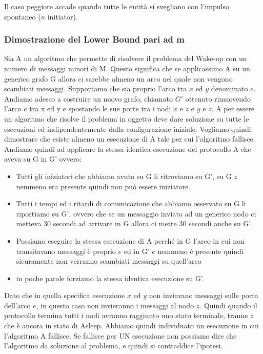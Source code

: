 Il caso peggiore accade quando tutte le entità si svegliano con l'impulso
spontaneo ($n$ initiator).

\subsubsection{Dimostrazione del Lower Bound pari ad m}
Sia A un algoritmo che permette di risolvere il problema del Wake-up con un
numero di messaggi minori di M. Questo significa che se applicassimo A su un
generico grafo G allora ci sarebbe almeno un arco nel quale non vengono
scambiati messaggi. Supponiamo che sia proprio l'arco tra $x$ ed $y$ denominato
$e$. Andiamo adesso a costruire un nuovo grafo, chiamato $G'$ ottenuto
rimuovendo l'arco $e$ tra x ed y e spostando le sue porte tra i nodi $x$ e $z$ e
$y$ e $z$. A per essere un algoritmo che risolve il problema in oggetto deve
dare soluzione su tutte le esecuzioni ed indipendentemente dalla configurazione
iniziale. Vogliamo quindi dimostrare che esiste almeno un esecuzione di A tale
per cui l'algoritmo fallisce. Andiamo quindi ad applicare la stessa identica
esecuzione del protocollo A che aveva su G in G' ovvero:
\begin{itemize}
    \item Tutti gli iniziatori che abbiamo avuto su G li ritroviamo su G', su G
          $z$ nemmeno era presente quindi non può essere iniziatore.
    \item Tutti i tempi ed i ritardi di comunicazione che abbiamo osservato su G
          li riportiamo su G', ovvero che se un messaggio inviato ad un generico nodo ci
          metteva 30 secondi ad arrivare in G allora ci mette 30 secondi anche su G'.
    \item Possiamo eseguire la stessa esecuzione di A perché in G l'arco in cui
          non transitavano messaggi è proprio $e$ ed in G' $e$ nemmeno è presente quindi
          sicuramente non verranno scambiati messaggi su quell'arco
    \item in poche parole forziamo la stessa identica esecuzione su G'.
\end{itemize}
Dato che in quella specifica esecuzione $x$ ed $y$ non inviavano messaggi sulle
porta dell'arco $e$, in questo caso non invieranno i messaggi al nodo $z$.
Quindi quando il protocollo termina tutti i nodi avranno raggiunto uno stato
terminale, tranne $z$ che è ancora in stato di Asleep. Abbiamo quindi
individuato un esecuzione in cui l'algoritmo A fallisce. Se fallisce per UN
esecuzione non possiamo dire che l'algoritmo da soluzione al problema, e quindi
si contraddice l'ipotesi.\\

